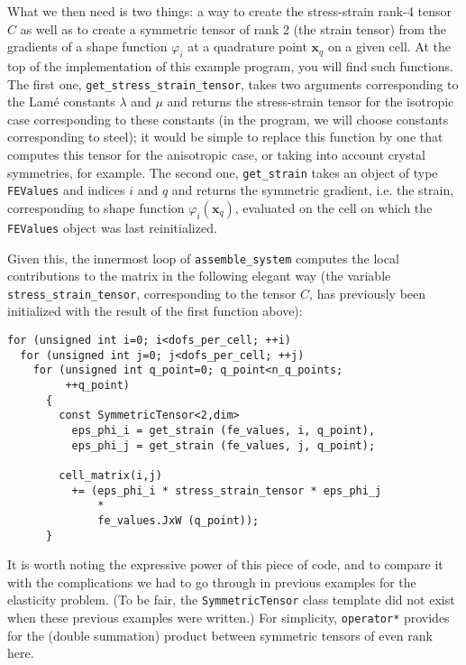 \documentclass{article}
\renewcommand{\vec}[1]{\mathbf{#1}}
\begin{document}
\begin{itemize}
  What we then need is two things: a way to create the stress-strain rank-4
  tensor $C$ as well as to create a symmetric tensor of rank 2 (the strain
  tensor) from the gradients of a shape function $\varphi_i$ at a quadrature
  point $\vec x_q$ on a given cell. At the top of the implementation of this
  example program, you will find such functions. The first one,
  \texttt{get\_stress\_strain\_tensor}, takes two arguments corresponding to
  the Lam\'e constants $\lambda$ and $\mu$ and returns the stress-strain tensor
  for the isotropic case corresponding to these constants (in the program, we
  will choose constants corresponding to steel); it would be simple to replace
  this function by one that computes this tensor for the anisotropic case, or
  taking into account crystal symmetries, for example. The second one,
  \texttt{get\_strain} takes an object of type \texttt{FEValues} and indices
  $i$ and $q$ and returns the symmetric gradient, i.e. the strain,
  corresponding to shape function $\varphi_i(\vec x_q)$, evaluated on the cell
  on which the \texttt{FEValues} object was last reinitialized.

  Given this, the innermost loop of \texttt{assemble\_system} computes the
  local contributions to the matrix in the following elegant way (the variable
  \texttt{stress\_strain\_tensor}, corresponding to the tensor $C$, has
  previously been initialized with the result of the first function above):
  \begin{verbatim}
for (unsigned int i=0; i<dofs_per_cell; ++i)
  for (unsigned int j=0; j<dofs_per_cell; ++j) 
    for (unsigned int q_point=0; q_point<n_q_points;
         ++q_point)
      {
        const SymmetricTensor<2,dim>
          eps_phi_i = get_strain (fe_values, i, q_point),
          eps_phi_j = get_strain (fe_values, j, q_point);

        cell_matrix(i,j) 
          += (eps_phi_i * stress_strain_tensor * eps_phi_j
              *
              fe_values.JxW (q_point));
      }
  \end{verbatim}
  It is worth noting the expressive power of this piece of code, and to
  compare it with the complications we had to go through in previous examples
  for the elasticity problem. (To be fair, the \texttt{SymmetricTensor} class
  template did not exist when these previous examples were written.) For
  simplicity, \texttt{operator*} provides for the (double summation) product
  between symmetric tensors of even rank here.


\end{itemize}
\end{document}
